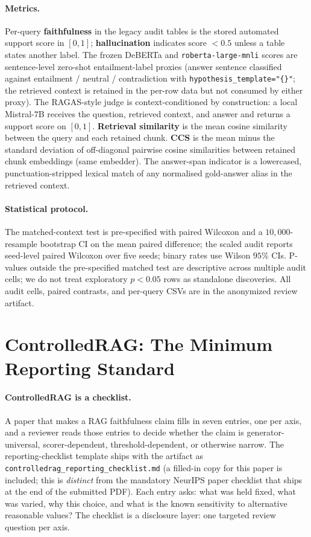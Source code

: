 \paragraph{Metrics.} Per-query \textbf{faithfulness} in the legacy
audit tables is the stored automated support score in $[0,1]$;
\textbf{hallucination} indicates score $<0.5$ unless a table states
another label. The frozen DeBERTa and \texttt{roberta-large-mnli}
scores are sentence-level zero-shot entailment-label proxies (answer
sentence classified against entailment / neutral / contradiction with
\texttt{hypothesis\_template="\{\}"}; the retrieved context is
retained in the per-row data but not consumed by either proxy). The
RAGAS-style judge is context-conditioned by construction: a local
Mistral-$7$B receives the question, retrieved context, and answer and
returns a support score on $[0,1]$. \textbf{Retrieval similarity} is
the mean cosine similarity between the query and each retained chunk.
\textbf{CCS} is the mean minus the standard deviation of off-diagonal
pairwise cosine similarities between retained chunk embeddings (same
embedder). The answer-span indicator is a lowercased,
punctuation-stripped lexical match of any normalised gold-answer
alias in the retrieved context.

\paragraph{Statistical protocol.} The matched-context test is
pre-specified with paired Wilcoxon and a $10{,}000$-resample
bootstrap CI on the mean paired difference; the scaled audit reports
seed-level paired Wilcoxon over five seeds; binary rates use Wilson
$95\%$ CIs. P-values outside the pre-specified matched test are
descriptive across multiple audit cells; we do not treat exploratory
$p<0.05$ rows as standalone discoveries. All audit cells, paired
contrasts, and per-query CSVs are in the anonymized review artifact.

\section{ControlledRAG: The Minimum Reporting Standard}
\label{sec:controlledrag}

\paragraph{ControlledRAG is a checklist.} A paper that makes a RAG
faithfulness claim fills in seven entries, one per axis, and a
reviewer reads those entries to decide whether the claim is
generator-universal, scorer-dependent, threshold-dependent, or
otherwise narrow. The reporting-checklist template ships with the
artifact as
\texttt{controlledrag\_reporting\_checklist.md} (a filled-in copy
for this paper is included; this is \emph{distinct} from the
mandatory NeurIPS paper checklist that ships at the end of the
submitted PDF). Each entry asks: what was held fixed, what was
varied, why this choice, and what is the known sensitivity to
alternative reasonable values? The checklist is a disclosure layer:
one targeted review question per axis.

